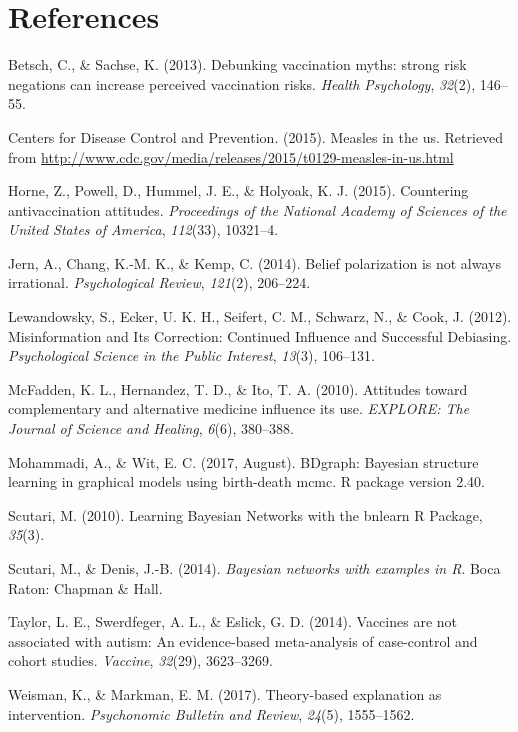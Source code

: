 \documentclass[10pt, letterpaper]{article}
\begin{document}
\section{References}\label{references}

\setlength{\parindent}{-0.1in} \setlength{\leftskip}{0.125in} \noindent

\hypertarget{refs}{}
\hypertarget{ref-Betsch2013}{}
Betsch, C., \& Sachse, K. (2013). Debunking vaccination myths: strong
risk negations can increase perceived vaccination risks. \emph{Health
Psychology}, \emph{32}(2), 146--55.

\hypertarget{ref-CDC2015}{}
Centers for Disease Control and Prevention. (2015). Measles in the us.
Retrieved from
\url{http://www.cdc.gov/media/releases/2015/t0129-measles-in-us.html}

\hypertarget{ref-Horne2015}{}
Horne, Z., Powell, D., Hummel, J. E., \& Holyoak, K. J. (2015).
Countering antivaccination attitudes. \emph{Proceedings of the National
Academy of Sciences of the United States of America}, \emph{112}(33),
10321--4.

\hypertarget{ref-Jern2014}{}
Jern, A., Chang, K.-M. K., \& Kemp, C. (2014). Belief polarization is
not always irrational. \emph{Psychological Review}, \emph{121}(2),
206--224.

\hypertarget{ref-Lewandowsky2012}{}
Lewandowsky, S., Ecker, U. K. H., Seifert, C. M., Schwarz, N., \& Cook,
J. (2012). Misinformation and Its Correction: Continued Influence and
Successful Debiasing. \emph{Psychological Science in the Public
Interest}, \emph{13}(3), 106--131.

\hypertarget{ref-McFadden2010}{}
McFadden, K. L., Hernandez, T. D., \& Ito, T. A. (2010). Attitudes
toward complementary and alternative medicine influence its use.
\emph{EXPLORE: The Journal of Science and Healing}, \emph{6}(6),
380--388.

\hypertarget{ref-Mohammadi2017}{}
Mohammadi, A., \& Wit, E. C. (2017, August). BDgraph: Bayesian structure
learning in graphical models using birth-death mcmc. R package version
2.40.

\hypertarget{ref-Scutari2010}{}
Scutari, M. (2010). Learning Bayesian Networks with the bnlearn R
Package, \emph{35}(3).

\hypertarget{ref-Scutari2014}{}
Scutari, M., \& Denis, J.-B. (2014). \emph{Bayesian networks with
examples in R}. Boca Raton: Chapman \& Hall.

\hypertarget{ref-Taylor2014}{}
Taylor, L. E., Swerdfeger, A. L., \& Eslick, G. D. (2014). Vaccines are
not associated with autism: An evidence-based meta-analysis of
case-control and cohort studies. \emph{Vaccine}, \emph{32}(29),
3623--3269.

\hypertarget{ref-Weisman2017}{}
Weisman, K., \& Markman, E. M. (2017). Theory-based explanation as
intervention. \emph{Psychonomic Bulletin and Review}, \emph{24}(5),
1555--1562.
\end{document}
